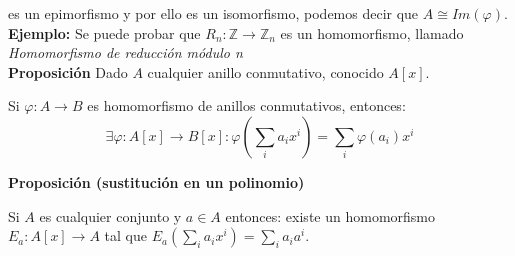 \documentclass[11pt]{article}
\providecommand{\ent}{\mathbb{Z}}
\begin{document}
es un epimorfismo y por ello es un isomorfismo, podemos decir que $A \cong Im(\varphi)$.\\


\textbf{Ejemplo:} Se puede probar que $R_n: \ent \to \ent_n$ es un homomorfismo, llamado \emph{Homomorfismo de reducción módulo n}\\


\textbf{Proposición}
 Dado $A$ cualquier anillo conmutativo, conocido $A[x]$.
 
 Si $\varphi:A \to B$ es homomorfismo de anillos conmutativos, entonces:
 \[
 \exists \varphi: A[x] \to B[x] : \varphi(\sum_i a_i x^i) = \sum_i\varphi(a_i) x^i
 \]


\textbf{Proposición (sustitución en un polinomio)}

Si $A$ es cualquier conjunto y $a \in A$ entonces: existe un homomorfismo $E_a: A[x] \to A$ tal que $E_a(\sum_i a_i x^i) = \sum_i a_i a^i$.
\end{document}
